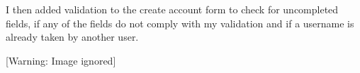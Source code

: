 \documentclass{article}
\begin{document}
\bigskip


\bigskip


\bigskip


\bigskip


\bigskip


\bigskip


\bigskip


\bigskip


\bigskip


\bigskip


\bigskip


\bigskip


\bigskip


\bigskip


\bigskip


\bigskip


\bigskip


\bigskip


\bigskip

I then added validation to the create account form to check for uncompleted fields, if any of the fields do not comply with my validation and if a username is already taken by another user.


\bigskip


\bigskip



\begin{center}
 [Warning: Image ignored] %

\end{center}

\bigskip


\bigskip


\bigskip


\bigskip


\bigskip


\bigskip


\bigskip


\bigskip


\bigskip


\bigskip


\bigskip


\bigskip


\bigskip


\bigskip


\bigskip


\bigskip


\bigskip


\bigskip
\end{document}
